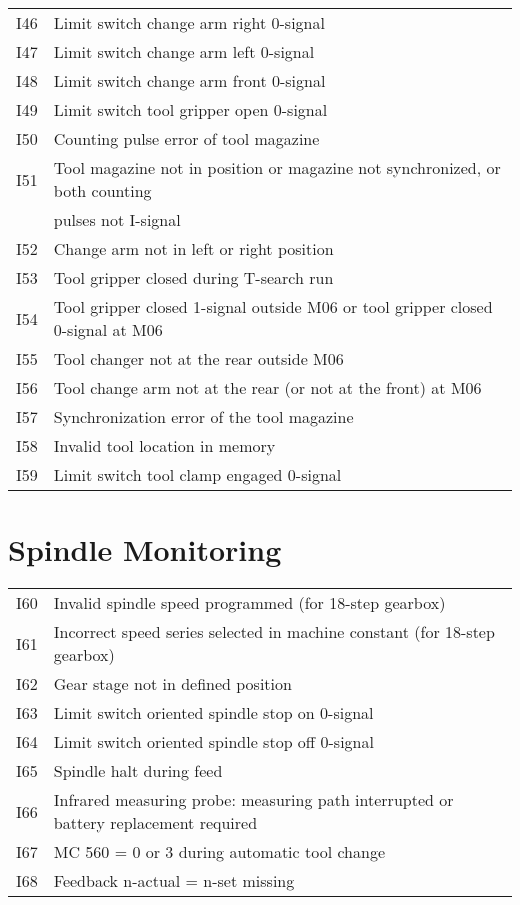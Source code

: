 \documentclass[openany,11pt]{book}
\begin{document}
\begin{table}[!h]
    \begin{tabular}{ll}
    I46 & Limit switch change arm right 0-signal \\
    I47 & Limit switch change arm left 0-signal \\
    I48 & Limit switch change arm front 0-signal \\
    I49 & Limit switch tool gripper open 0-signal \\
    I50 & Counting pulse error of tool magazine \\
    I51 & Tool magazine not in position or magazine not synchronized, or both counting \\
        & pulses not I-signal \\
    I52 & Change arm not in left or right position \\
    I53 & Tool gripper closed during T-search run \\
    I54 & Tool gripper closed 1-signal outside M06 or tool gripper closed 0-signal at M06 \\
    I55 & Tool changer not at the rear outside M06 \\
    I56 & Tool change arm not at the rear (or not at the front) at M06 \\
    I57 & Synchronization error of the tool magazine \\
    I58 & Invalid tool location in memory \\
    I59 & Limit switch tool clamp engaged 0-signal \\
    \end{tabular}
\end{table}

\section*{Spindle Monitoring}

\begin{table}[!h]
    \begin{tabular}{ll}
    I60 & Invalid spindle speed programmed (for 18-step gearbox) \\
    I61 & Incorrect speed series selected in machine constant (for 18-step gearbox) \\
    I62 & Gear stage not in defined position \\
    I63 & Limit switch oriented spindle stop on 0-signal \\
    I64 & Limit switch oriented spindle stop off 0-signal \\
    I65 & Spindle halt during feed \\
    I66 & Infrared measuring probe: measuring path interrupted or battery replacement required \\
    I67 & MC 560 = 0 or 3 during automatic tool change \\
    I68 & Feedback n-actual = n-set missing \\
    \end{tabular}
\end{table}
\end{document}
